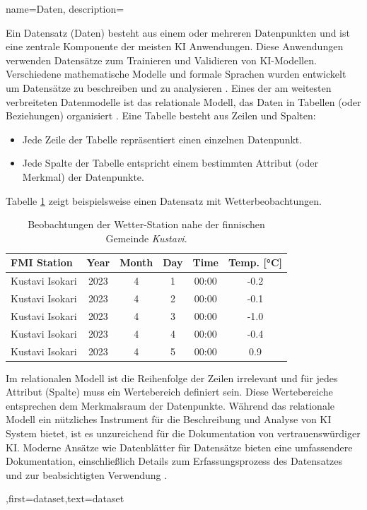 {{{{{
{name={Daten},
	description={Ein Datensatz (Daten) besteht aus einem oder mehreren Datenpunkten 
		und ist eine zentrale Komponente der meisten KI Anwendungen. Diese Anwendungen 
		verwenden Datensätze zum Trainieren und Validieren von KI-Modellen. Verschiedene 
		mathematische Modelle und formale Sprachen wurden entwickelt um Datensätze 
		zu beschreiben und zu analysieren \cite{silberschatz2019database,abiteboul1995foundations,hoberman2009data,ramakrishnan2002database}.  
		Eines der am weitesten verbreiteten Datenmodelle ist das relationale Modell, das 
		Daten in Tabellen (oder Beziehungen) organisiert \cite{silberschatz2019database}.
		Eine Tabelle besteht aus Zeilen und Spalten:
		\begin{itemize} 
			\item Jede Zeile der Tabelle repräsentiert einen einzelnen Datenpunkt.
			\item Jede Spalte der Tabelle entspricht einem bestimmten Attribut (oder Merkmal) der 
			Datenpunkte. 
		\end{itemize}
		Tabelle \ref{tab:temperature} zeigt beispielsweise einen Datensatz mit Wetterbeobachtungen.
		\begin{table}[ht]
			\centering
			\begin{tabular}{|l|c|c|c|c|c|}
				\hline
				\textbf{FMI Station} & \textbf{Year} & \textbf{Month} & \textbf{Day} & \textbf{Time} & \textbf{Temp. [°C]} \\ 
				\hline
				Kustavi Isokari & 2023 & 4 & 1 & 00:00 & -0.2 \\ \hline
				Kustavi Isokari & 2023 & 4 & 2 & 00:00 & -0.1 \\ \hline
				Kustavi Isokari & 2023 & 4 & 3 & 00:00 & -1.0 \\ \hline
				Kustavi Isokari & 2023 & 4 & 4 & 00:00 & -0.4 \\ \hline
				Kustavi Isokari & 2023 & 4 & 5 & 00:00 & 0.9 \\ \hline
			\end{tabular}
			\caption{Beobachtungen der Wetter-Station nahe der finnischen Gemeinde \emph{Kustavi}.}
			\label{tab:temperature}
		\end{table}
		Im relationalen Modell ist die Reihenfolge der Zeilen irrelevant und für 
		jedes Attribut (Spalte) muss ein Wertebereich definiert sein. Diese Wertebereiche 
		entsprechen dem Merkmalsraum der Datenpunkte. Während das relationale Modell
		ein nützliches Instrument für die Beschreibung und Analyse von KI System bietet, ist 
		es unzureichend für die Dokumentation von vertrauenswürdiger KI. Moderne Ansätze wie
		Datenblätter für Datensätze bieten eine umfassendere Dokumentation, einschließlich Details 
		zum Erfassungsprozess des Datensatzes und zur beabsichtigten Verwendung \cite{DatasheetData2021}.},first={dataset},text={dataset}  
}




}}}}}
